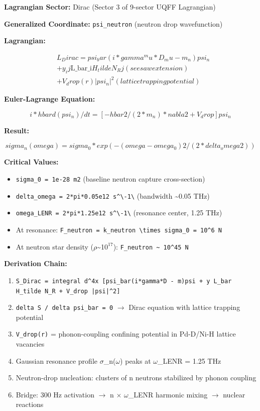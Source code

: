 \documentclass[12pt,a4paper]{article}
\begin{document}
\textbf{Lagrangian Sector:} Dirac (Sector 3 of 9-sector UQFF Lagrangian)

\textbf{Generalized Coordinate:} \texttt{psi\_neutron} (neutron drop wavefunction)

\textbf{Lagrangian:}

\begin{equation}
\begin{aligned}
  & L_Dirac = psi_bar (i*gamma^mu*D_mu - m_n) psi_n \\
  & + y_ij \text{L\_bar\_i} H_tilde N_Rj  (seesaw extension) \\
  & + V_drop(r) |psi_n|^2  (lattice trapping potential)
\end{aligned}
\end{equation}

\textbf{Euler-Lagrange Equation:}

\begin{equation}
i*hbar d(psi_n)/dt = [-hbar2/(2*m_n) * nabla2 + V_drop] psi_n
\end{equation}

\textbf{Result:}

\begin{equation}
sigma_n(omega) = sigma_0 * exp(-(omega - omega_0)2 / (2*delta_omega2))
\end{equation}

\textbf{Critical Values:}

\begin{itemize}
  \item \texttt{sigma\_0 = 1e-28 m2} (baseline neutron capture cross-section)
  \item \texttt{delta\_omega = 2*pi*0.05e12 s\^{}\textbackslash {-1\textbackslash }} (bandwidth \textasciitilde{}0.05 THz)
  \item \texttt{omega\_LENR = 2*pi*1.25e12 s\^{}\textbackslash {-1\textbackslash }} (resonance center, 1.25 THz)
  \item At resonance: \texttt{F\_neutron = k\_neutron \textbackslash times sigma\_0 = 10\^{}6 N}
  \item At neutron star density ($\rho$\textasciitilde{}1$0^{17}$): \texttt{F\_neutron \textasciitilde{} 10\^{}45 N}
\end{itemize}

\textbf{Derivation Chain:}

\begin{enumerate}
  \item \texttt{S\_Dirac = integral d\^{}4x [psi\_bar(i*gamma*D - m)psi + y L\_bar H\_tilde N\_R + V\_drop |psi|\^{}2]}
  \item \texttt{delta S / delta psi\_bar = 0} $\to$ Dirac equation with lattice trapping potential
  \item \texttt{V\_drop(r)} = phonon-coupling confining potential in Pd-D/Ni-H lattice vacancies
  \item Gaussian resonance profile $\sigma$\_n($\omega$) peaks at $\omega$\_LENR = 1.25 THz
  \item Neutron-drop nucleation: clusters of n neutrons stabilized by phonon coupling
  \item Bridge: 300 Hz activation $\to$ n $\times$ $\omega$\_LENR harmonic mixing $\to$ nuclear reactions
\end{enumerate}
\end{document}

